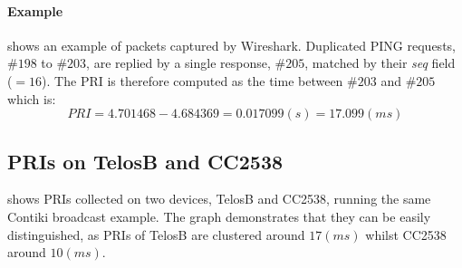 \paragraph{Example}


 shows an example of packets captured by Wireshark\cite{Wireshark}. Duplicated PING requests, \#$198$ to \#$203$, are replied by a single response, \#$205$, matched by their \textit{seq} field ($=16$). The PRI is therefore computed as the time between \#$203$ and \#$205$ which is:
\begin{equation*}
PRI = 4.701468 - 4.684369 = 0.017099(s) = 17.099(ms)
\end{equation*}

\subsection{PRIs on TelosB and CC2538}

 shows PRIs collected on two devices, TelosB and CC2538, running the same Contiki broadcast example. The graph demonstrates that they can be easily distinguished, as PRIs of TelosB are clustered around $17(ms)$ whilst CC2538 around $10(ms)$.

